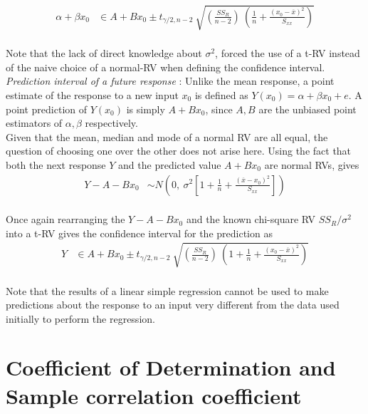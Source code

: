\begin{align}
	\alpha + \beta x_0 &\in A + B x_0 \pm t_{\gamma/2, n-2}\ \sqrt{\left(\frac{SS_R}{n-2}\right)\ \left( \frac{1}{n} + \frac{(x_0  - \overline{x})^2}{S_{xx}}\right)}
\end{align}\\

Note that the lack of direct knowledge about $ \sigma^2 $, forced the use of a t-RV instead of the naive choice of a normal-RV when defining the confidence interval.\\

\textit{Prediction interval of a future response} : Unlike the mean response, a point estimate of the response to a new input $ x_0 $ is defined as $ Y(x_0)  = \alpha + \beta x_0 + e$. A point prediction of $ Y(x_0) $ is simply $ A + B x_0 $, since $ A, B $ are the unbiased point estimators of $ \alpha, \beta $ respectively.\\

Given that the mean, median and mode of a normal RV are all equal, the question of choosing one over the other does not arise here. Using the fact that both the next response $ Y $ and the predicted value $ A + B x_0 $ are normal RVs, gives\\

\begin{align}
	Y - A - B x_0 &\sim N\left( 0,\ \sigma^2 \left[1 + \frac{1}{n} + \frac{(\overline{x} - x_0)^2}{S_{xx}} \right]\right)
\end{align}\\

Once again rearranging the $ Y - A - B x_0 $ and the known chi-square RV $ SS_R / \sigma^2 $ into a t-RV gives the confidence interval for the prediction as \\

\begin{align}
	Y &\in A + B x_0 \pm t_{\gamma/2, n-2}\ \sqrt{\left(\frac{SS_R}{n-2}\right)\ \left( 1 + \frac{1}{n} + \frac{(x_0  - \overline{x})^2}{S_{xx}}\right)}
\end{align}\\

Note that the results of a linear simple regression cannot be used to make predictions about the response to an input very different from the data used initially to perform the regression.\\

\section{Coefficient of Determination and Sample correlation coefficient}

